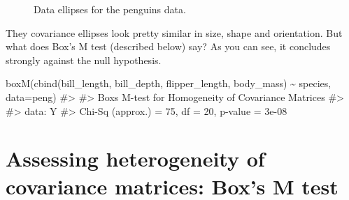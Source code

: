 \documentclass[
  letterpaper,
  10pt,
  krantz2]{krantz}
\makeatletter
\newenvironment{Shaded}{\begin{snugshade}}{\end{snugshade}}
\newcommand{\AttributeTok}[1]{\textcolor[rgb]{0.40,0.45,0.13}{#1}}
\newcommand{\CommentTok}[1]{\textcolor[rgb]{0.37,0.37,0.37}{#1}}
\newcommand{\FunctionTok}[1]{\textcolor[rgb]{0.28,0.35,0.67}{#1}}
\newcommand{\NormalTok}[1]{\textcolor[rgb]{0.00,0.23,0.31}{#1}}
\newcommand{\SpecialCharTok}[1]{\textcolor[rgb]{0.37,0.37,0.37}{#1}}
\newenvironment{kframe}{%
  \medskip{}
  \setlength{\fboxsep}{.8em}
  \def\at@end@of@kframe{}%
  \ifinner\ifhmode%
  \def\at@end@of@kframe{\end{minipage}}%
  \begin{minipage}{\columnwidth}%
  \fi\fi%
  \def\FrameCommand##1{\hskip\@totalleftmargin \hskip-\fboxsep
  \colorbox{shadecolor}{##1}\hskip-\fboxsep
      \hskip-\linewidth \hskip-\@totalleftmargin \hskip\columnwidth}%
  \MakeFramed {\advance\hsize-\width
    \@totalleftmargin\z@ \linewidth\hsize
    \@setminipage}}%
{\par\unskip\endMakeFramed%
  \at@end@of@kframe}
\renewenvironment{Shaded}{\begin{kframe}}{\end{kframe}}
\makeatother
\begin{document}
\begin{figure}


\caption{\label{fig-peng-covEllipse0}Data ellipses for the penguins
data.}

\end{figure}%

They covariance ellipses look pretty similar in size, shape and
orientation. But what does Box's M test (described below) say? As you
can see, it concludes strongly against the null hypothesis.

\begin{Shaded}
\begin{Highlighting}[]
\FunctionTok{boxM}\NormalTok{(}\FunctionTok{cbind}\NormalTok{(bill\_length, bill\_depth, flipper\_length, body\_mass) }\SpecialCharTok{\textasciitilde{}}\NormalTok{ species, }\AttributeTok{data=}\NormalTok{peng)}
\CommentTok{\#\textgreater{} }
\CommentTok{\#\textgreater{}  Box\textquotesingle{}s M{-}test for Homogeneity of Covariance Matrices}
\CommentTok{\#\textgreater{} }
\CommentTok{\#\textgreater{} data:  Y}
\CommentTok{\#\textgreater{} Chi{-}Sq (approx.) = 75, df = 20, p{-}value = 3e{-}08}
\end{Highlighting}
\end{Shaded}

\section{Assessing heterogeneity of covariance matrices: Box's M
test}\label{sec-boxM}
\end{document}
